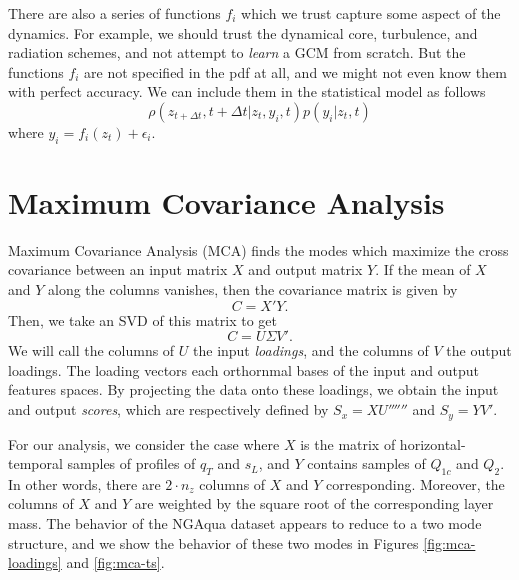 \documentclass{report}
\newcommand{\1}[1]{\mathds{1}\left[#1\right]}
\begin{document}
There are also a series of functions $f_i$ which we trust capture some aspect of
the dynamics. 
For example, we should trust the dynamical core, turbulence, and radiation
schemes, and not attempt to \emph{learn} a GCM from scratch.
But the functions $f_i$ are not specified in the pdf at all, and we might not
even know them with perfect accuracy. We can include them in the statistical
model as follows
\[\rho(z_{t+\Delta t}, t+ \Delta t| z_t, y_i, t) p(y_i|z_t, t) \]
where $y_i = f_i(z_t) + \epsilon_i$.




\section{Maximum Covariance Analysis}
\label{sec:mca}

Maximum Covariance Analysis (MCA) finds the modes which maximize the cross
covariance between an input matrix $X$ and output matrix $Y$. 
If the mean of $X$ and $Y$ along the columns vanishes, then the covariance
matrix is given by
\[C=X'Y.\]
Then, we take an SVD of this matrix to get
\[C=U\Sigma V'.\] We will call the columns of $U$ the input \emph{loadings}, and
the columns of $V$ the output loadings. 
The loading vectors each orthornmal bases of the input and output features
spaces. 
By projecting the data onto these loadings, we obtain the input and output
\emph{scores}, which are respectively defined by $S_x = X U''''''$ and $S_y=YV'$. 

For our analysis, we consider the case where $X$ is the matrix of
horizontal-temporal samples of profiles of $q_T$ and $s_L$, and $Y$ contains
samples of $Q_{1c}$ and $Q_2$. In other words, there are $2\cdot n_z$ columns of
$X$ and $Y$ corresponding. Moreover, the columns of $X$ and $Y$ are weighted by
the square root of the corresponding layer mass. The behavior of the NGAqua
dataset appears to reduce to a two mode structure, and we show the behavior of
these two modes in Figures \ref{fig:mca-loadings} and \ref{fig:mca-ts}.
\end{document}
